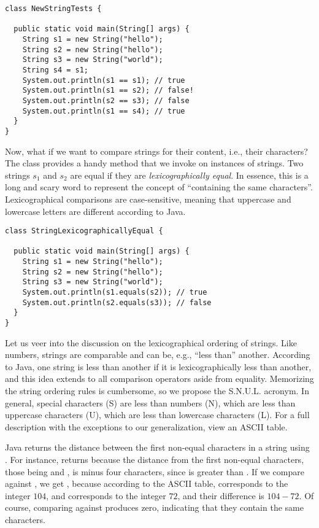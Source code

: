 \begin{cl}{}
\begin{lstlisting}[language=MyJava]
class NewStringTests {

  public static void main(String[] args) {
    String s1 = new String("hello");
    String s2 = new String("hello");
    String s3 = new String("world");
    String s4 = s1;
    System.out.println(s1 == s1); // true
    System.out.println(s1 == s2); // false!
    System.out.println(s2 == s3); // false
    System.out.println(s1 == s4); // true
  }
}
\end{lstlisting}
\end{cl}

Now, what if we want to compare strings for their content, i.e., their characters? The  class provides a handy  method that we invoke on instances of strings. Two strings $s_1$ and $s_2$ are equal if they are \textit{lexicographically equal}. In essence, this is a long and scary word to represent the concept of ``containing the same characters''. Lexicographical comparisons are case-sensitive, meaning that uppercase and lowercase letters are different according to Java.

\begin{cl}{}
\begin{lstlisting}[language=MyJava]
class StringLexicographicallyEqual {

  public static void main(String[] args) {
    String s1 = new String("hello");
    String s2 = new String("hello");
    String s3 = new String("world");
    System.out.println(s1.equals(s2)); // true
    System.out.println(s2.equals(s3)); // false
  }
}
\end{lstlisting}
\end{cl}

Let us veer into the discussion on the lexicographical ordering of strings. Like numbers, strings are comparable and can be, e.g., ``less than'' another. According to Java, one string is less than another if it is lexicographically less than another, and this idea extends to all comparison operators aside from equality. Memorizing the string ordering rules is cumbersome, so we propose the S.N.U.L. acronym. In general, special characters (S) are less than numbers (N), which are less than uppercase characters (U), which are less than lowercase characters (L). For a full description with the exceptions to our generalization, view an ASCII table. 

\example Java returns the distance between the first non-equal characters in a string using . For instance,  returns  because the distance from the first non-equal characters, those being  and , is minus four characters, since  is greater than . If we compare  against , we get , because according to the ASCII table,  corresponds to the integer $104$, and  corresponds to the integer $72$, and their difference is $104 - 72$. Of course, comparing  against  produces zero, indicating that they contain the same characters.


